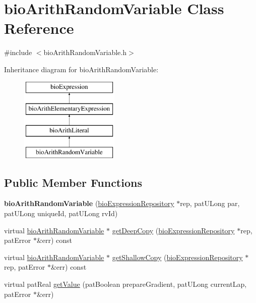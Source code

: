 \hypertarget{classbio_arith_random_variable}{}\section{bio\+Arith\+Random\+Variable Class Reference}
\label{classbio_arith_random_variable}


{\ttfamily \#include $<$bio\+Arith\+Random\+Variable.\+h$>$}

Inheritance diagram for bio\+Arith\+Random\+Variable\+:\begin{figure}[H]
\begin{center}
\leavevmode
\includegraphics[height=4.000000cm]{classbio_arith_random_variable}
\end{center}
\end{figure}
\subsection*{Public Member Functions}
\begin{DoxyCompactItemize}
\item 
\mbox{\label{classbio_arith_random_variable_a2ae1c241087441b487da80770d119257}} 
{\bfseries bio\+Arith\+Random\+Variable} (\hyperlink{classbio_expression_repository}{bio\+Expression\+Repository} $\ast$rep, pat\+U\+Long par, pat\+U\+Long unique\+Id, pat\+U\+Long rv\+Id)
\item 
virtual \hyperlink{classbio_arith_random_variable}{bio\+Arith\+Random\+Variable} $\ast$ \hyperlink{classbio_arith_random_variable_a258a34932273d07449117a20704e7811}{get\+Deep\+Copy} (\hyperlink{classbio_expression_repository}{bio\+Expression\+Repository} $\ast$rep, pat\+Error $\ast$\&err) const
\item 
virtual \hyperlink{classbio_arith_random_variable}{bio\+Arith\+Random\+Variable} $\ast$ \hyperlink{classbio_arith_random_variable_a970e51cefe17a32b0c752e8bef35285f}{get\+Shallow\+Copy} (\hyperlink{classbio_expression_repository}{bio\+Expression\+Repository} $\ast$rep, pat\+Error $\ast$\&err) const
\item 
virtual pat\+Real \hyperlink{classbio_arith_random_variable_adc6a79d35ee6e66e59c3be9bc9f2c32b}{get\+Value} (pat\+Boolean prepare\+Gradient, pat\+U\+Long current\+Lap, pat\+Error $\ast$\&err)
\end{DoxyCompactItemize}
